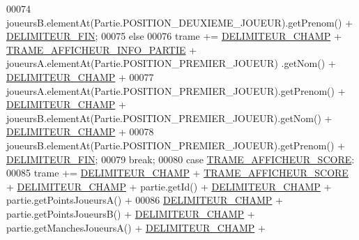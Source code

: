 \begin{DoxyCode}
00074                             joueursB.elementAt(Partie.POSITION\_DEUXIEME\_JOUEUR).getPrenom() + 
      \hyperlink{classcom_1_1example_1_1area_1_1_protocol_a_r_e_a_a77f13634749dc65bc24d98672ff7ba03}{DELIMITEUR\_FIN};
00075                 \textcolor{keywordflow}{else}
00076                     trame += \hyperlink{classcom_1_1example_1_1area_1_1_protocol_a_r_e_a_afec644c1c2a6563a0ee16a689044433c}{DELIMITEUR\_CHAMP} + 
      \hyperlink{classcom_1_1example_1_1area_1_1_protocol_a_r_e_a_a4f5be4d0653ad5f52ae5f5c673ec728d}{TRAME\_AFFICHEUR\_INFO\_PARTIE} + joueursA.elementAt(Partie.POSITION\_PREMIER\_JOUEUR)
      .getNom() + \hyperlink{classcom_1_1example_1_1area_1_1_protocol_a_r_e_a_afec644c1c2a6563a0ee16a689044433c}{DELIMITEUR\_CHAMP} +
00077                             joueursA.elementAt(Partie.POSITION\_PREMIER\_JOUEUR).getPrenom() + 
      \hyperlink{classcom_1_1example_1_1area_1_1_protocol_a_r_e_a_afec644c1c2a6563a0ee16a689044433c}{DELIMITEUR\_CHAMP} + joueursB.elementAt(Partie.POSITION\_PREMIER\_JOUEUR).getNom() + 
      \hyperlink{classcom_1_1example_1_1area_1_1_protocol_a_r_e_a_afec644c1c2a6563a0ee16a689044433c}{DELIMITEUR\_CHAMP} +
00078                             joueursB.elementAt(Partie.POSITION\_PREMIER\_JOUEUR).getPrenom() + 
      \hyperlink{classcom_1_1example_1_1area_1_1_protocol_a_r_e_a_a77f13634749dc65bc24d98672ff7ba03}{DELIMITEUR\_FIN};
00079                 \textcolor{keywordflow}{break};
00080             \textcolor{keywordflow}{case} \hyperlink{classcom_1_1example_1_1area_1_1_protocol_a_r_e_a_a63ba437bfc08504af2caaec99d61a230}{TRAME\_AFFICHEUR\_SCORE}:
00085                 trame += \hyperlink{classcom_1_1example_1_1area_1_1_protocol_a_r_e_a_afec644c1c2a6563a0ee16a689044433c}{DELIMITEUR\_CHAMP} + 
      \hyperlink{classcom_1_1example_1_1area_1_1_protocol_a_r_e_a_a63ba437bfc08504af2caaec99d61a230}{TRAME\_AFFICHEUR\_SCORE} + \hyperlink{classcom_1_1example_1_1area_1_1_protocol_a_r_e_a_afec644c1c2a6563a0ee16a689044433c}{DELIMITEUR\_CHAMP} + partie.getId() + 
      \hyperlink{classcom_1_1example_1_1area_1_1_protocol_a_r_e_a_afec644c1c2a6563a0ee16a689044433c}{DELIMITEUR\_CHAMP} + partie.getPointsJoueursA() +
00086                         \hyperlink{classcom_1_1example_1_1area_1_1_protocol_a_r_e_a_afec644c1c2a6563a0ee16a689044433c}{DELIMITEUR\_CHAMP} + partie.getPointsJoueursB() + 
      \hyperlink{classcom_1_1example_1_1area_1_1_protocol_a_r_e_a_afec644c1c2a6563a0ee16a689044433c}{DELIMITEUR\_CHAMP} + partie.getManchesJoueursA() + 
      \hyperlink{classcom_1_1example_1_1area_1_1_protocol_a_r_e_a_afec644c1c2a6563a0ee16a689044433c}{DELIMITEUR\_CHAMP} +

\end{DoxyCode}
